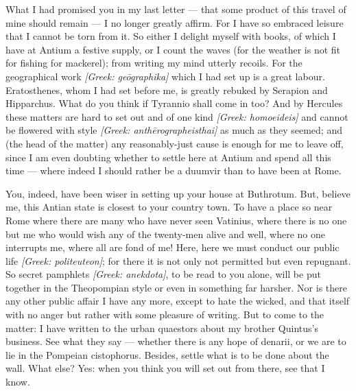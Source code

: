 

 What I had promised you in my last letter --- that some product of this travel of mine should remain --- I no longer greatly affirm. For I have so embraced leisure that I cannot be torn from it. So either I delight myself with books, of which I have at Antium a festive supply, or I count the waves (for the weather is not fit for fishing for mackerel); from writing my mind utterly recoils. For the geographical work \textit{[Greek: ge\=ographika]} which I had set up is a great labour. Eratosthenes, whom I had set before me, is greatly rebuked by Serapion and Hipparchus. What do you think if Tyrannio shall come in too? And by Hercules these matters are hard to set out and of one kind \textit{[Greek: homoeideis]} and cannot be flowered with style \textit{[Greek: anth\=erographeisthai]} as much as they seemed; and (the head of the matter) any reasonably-just cause is enough for me to leave off, since I am even doubting whether to settle here at Antium and spend all this time --- where indeed I should rather be a duumvir than to have been at Rome.

 You, indeed, have been wiser in setting up your house at Buthrotum. But, believe me, this Antian state is closest to your country town. To have a place so near Rome where there are many who have never seen Vatinius, where there is no one but me who would wish any of the twenty-men alive and well, where no one interrupts me, where all are fond of me! Here, here we must conduct our public life \textit{[Greek: politeuteon]}; for there it is not only not permitted but even repugnant. So secret pamphlets \textit{[Greek: anekdota]}, to be read to you alone, will be put together in the Theopompian style or even in something far harsher. Nor is there any other public affair I have any more, except to hate the wicked, and that itself with no anger but rather with some pleasure of writing. But to come to the matter: I have written to the urban quaestors about my brother Quintus's business. See what they say --- whether there is any hope of denarii, or we are to lie in the Pompeian cistophorus. Besides, settle what is to be done about the wall. What else? Yes: when you think you will set out from there, see that I know.
